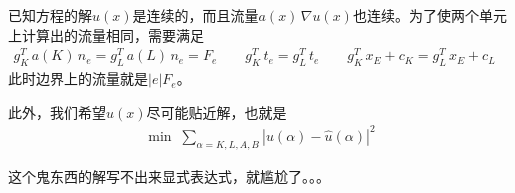 \documentclass[12pt,a4paper]{article}
\theoremstyle{plain}
\begin{document}
已知方程的解$u(x)$是连续的，而且流量$a(x) \, \nabla u(x)$也连续。为了使两个单元上计算出的流量相同，需要满足
\begin{align*}
g_K^T \, a(K) \, n_e = g_L^T \, a(L) \, n_e = F_e \qquad
g_K^T \, t_e = g_L^T \, t_e \qquad
g_K^T \, x_E + c_K = g_L^T \, x_E + c_L \qquad
\end{align*}
此时边界上的流量就是$|e| F_e$。

此外，我们希望$\hat{u}(x)$尽可能贴近解，也就是
\begin{align*}
\min \; \sum_{\alpha = K,L,A,B} |u(\alpha) - \hat{u}(\alpha)|^2
\end{align*}

这个鬼东西的解写不出来显式表达式，就尴尬了。。。

%
%
%
%
%
%
\end{document}
